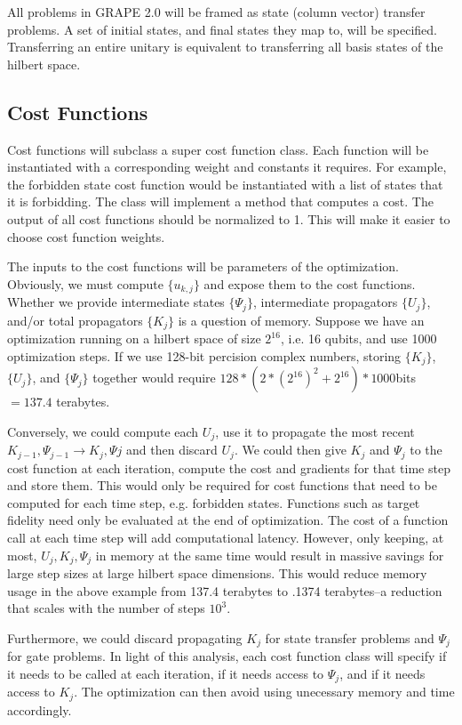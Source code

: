\documentclass[letterpaper, 12pt]{article}
\begin{document}
All problems in GRAPE 2.0 will be framed as state (column vector) transfer problems. A set of initial states, and final states they map to, will be specified. Transferring an entire unitary is equivalent to transferring all basis states of the hilbert space.

\subsection{Cost Functions}
Cost functions will subclass a super cost function class. Each function will be instantiated with a corresponding weight and constants it requires. For example, the forbidden state cost function would be instantiated with a list of states that it is forbidding. The class will implement a method that computes a cost. The output of all cost functions should be normalized to 1. This will make it easier to choose cost function weights.

The inputs to the cost functions will be parameters of the optimization. Obviously, we must compute $\{u_{k, j}\}$ and expose them to the cost functions. Whether we provide intermediate states $\{\Psi_{j}\}$, intermediate propagators $\{U_{j}\}$, and/or total propagators $\{K_{j}\}$ is a question of memory. Suppose we have an optimization running on a hilbert space of size $2^{16}$, i.e. 16 qubits, and use 1000 optimization steps. If we use 128-bit percision complex numbers, storing $\{K_{j}\}$, $\{U_{j}\}$, and $\{\Psi_{j}\}$ together would require $128 * (2 * (2 ^{16})^{2} + 2^{16}) * 1000$bits $= 137.4$ terabytes.

Conversely, we could compute each $U_{j}$, use it to propagate the most recent $K_{j-1}, \Psi_{j-1} \rightarrow K_{j}, \Psi{j}$ and then discard $U_{j}$. We could then give $K_{j}$ and $\Psi_{j}$ to the cost function at each iteration, compute the cost and gradients for that time step and store them. This would only be required for cost functions that need to be computed for each time step, e.g. forbidden states. Functions such as target fidelity need only be evaluated at the end of optimization. The cost of a function call at each time step will add computational latency. However, only keeping, at most, $U_{j}, K_{j}, \Psi_{j}$ in memory at the same time would result in massive savings for large step sizes at large hilbert space dimensions. This would reduce memory usage in the above example from 137.4 terabytes to .1374 terabytes--a reduction that scales with the number of steps $10^{3}$.

Furthermore, we could discard propagating $K_{j}$ for state transfer problems and $\Psi_{j}$ for gate problems. In light of this analysis, each cost function class will specify if it needs to be called at each iteration, if it needs access to $\Psi_{j}$, and if it needs access to $K_{j}$. The optimization can then avoid using unecessary memory and time accordingly.
\end{document}
